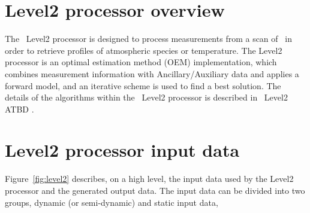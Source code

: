 \section{Level2 processor overview}

The \smr\ Level2 processor is designed to process
measurements from a scan of \smr\ in order to
retrieve profiles of atmospheric species or temperature.    
The Level2 processor is an optimal estimation method (OEM)
implementation, which combines measurement
information with Ancillary/Auxiliary data
and applies a forward model, and an iterative
scheme is used to find a best solution.   
The details of the algorithms within the
\smr\ Level2 processor is described in \smr\ Level2 ATBD
\citep{atbdl2}.

\section{Level2 processor input data}

Figure~\ref{fig:level2} describes, on a high level, the input data used
by the Level2 processor and the generated output data.
The input data can be divided into two groups,
dynamic (or semi-dynamic) and static input data,

